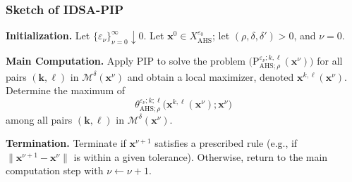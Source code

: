 \documentclass[aspectratio=169,xcolor=dvipsnames]{beamer}
\begin{document}
\begin{frame}
  \frametitle{Sketch of IDSA-PIP}
  \small
  \setlength{\abovedisplayskip}{5pt}
  \setlength{\belowdisplayskip}{5pt}
  \setlength{\parskip}{0.14cm}

  \textbf{Initialization.} Let $\{\varepsilon_\nu\}_{\nu=0}^{\infty}\downarrow 0$.
  Let $\mathbf{x}^0\in X^{\varepsilon_0}_{\mathrm{AHS}}$; let
  $(\rho,\delta,\delta')>0$, and $\nu=0$.

  \textbf{Main Computation.} Apply PIP to solve the problem
  $\bigl(\mathrm{P}^{\varepsilon_\nu;k,\ell}_{\mathrm{AHS};\rho}
  (\mathbf{x}^\nu)\bigr)$ for all pairs $(\mathbf{k},\boldsymbol{\ell})$ in
  $\mathcal{M}^\delta(\mathbf{x}^\nu)$ and obtain a local maximizer, denoted
  $\mathbf{x}^{k,\ell}(\mathbf{x}^\nu)$. Determine the maximum of
  \[
    \theta^{\varepsilon_\nu;k;\ell}_{\mathrm{AHS};\rho}
    \bigl(\mathbf{x}^{k,\ell}(\mathbf{x}^\nu);\mathbf{x}^\nu\bigr)
  \]
  among all pairs $(\mathbf{k},\boldsymbol{\ell})$ in
  $\mathcal{M}^\delta(\mathbf{x}^\nu)$.

  \textbf{Termination.} Terminate if $\mathbf{x}^{\nu+1}$ satisfies a prescribed
  rule (e.g., if $\|\mathbf{x}^{\nu+1}-\mathbf{x}^\nu\|$ is within a given
  tolerance). Otherwise, return to the main computation step with
  $\nu\leftarrow\nu+1$.
\end{frame}
\end{document}
